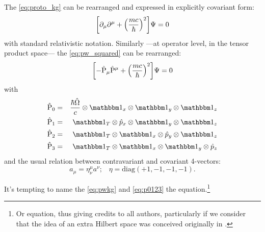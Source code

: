 The \eqref{eq:proto_kg} can be rearranged and expressed in explicitly covariant form:
\begin{equation}
  \qty[\partial_{\mu}\partial^{\mu} + \qty(\frac{mc}{\hbar})^2]\Psi = 0
\end{equation}
with standard relativistic notation.
Similarly
---at operator level, in the tensor product space---
the \eqref{eq:pw_squared} can be rearranged:
\begin{equation}\label{eq:pwkg}
  \qty[- \hat{\mathrm{P}}_{\mu} \hat{\mathrm{P}}^{\mu} + \qty(\frac{mc}{\hbar})^2]\Psi = 0
\end{equation}
with
\begin{equation}
\begin{aligned}\label{eq:p0123}
  \hat{\mathrm{P}}_0 &=& \frac{\hbar\hat{\Omega}}{c}  \ox \idop_x   \ox \idop_y   \ox \idop_z \\
  \hat{\mathrm{P}}_1 &=& \idop_T                      \ox \hat{p}_x \ox \idop_y   \ox \idop_z \\
  \hat{\mathrm{P}}_2 &=& \idop_T                      \ox \idop_x   \ox \hat{p}_y \ox \idop_z \\
  \hat{\mathrm{P}}_3 &=& \idop_T                      \ox \idop_x   \ox \idop_y   \ox \hat{p}_z
\end{aligned}
\end{equation}
and the usual relation between contravariant and covariant 4-vectors:
\begin{equation}
  a_\mu = \eta_{\nu}^{\mu} a^{\nu} \text{;} \quad
  \eta = \mathrm{diag}(+1, -1, -1, -1)
  \text{.}
\end{equation}

It's tempting to name the \eqref{eq:pwkg} and \eqref{eq:p0123} the 
equation.\footnote{
  Or 
  equation, thus giving
  credits to all authors, particularly if we consider that the idea of an extra Hilbert space
  was conceived originally in \cite{Lloyd:Time}.
}

